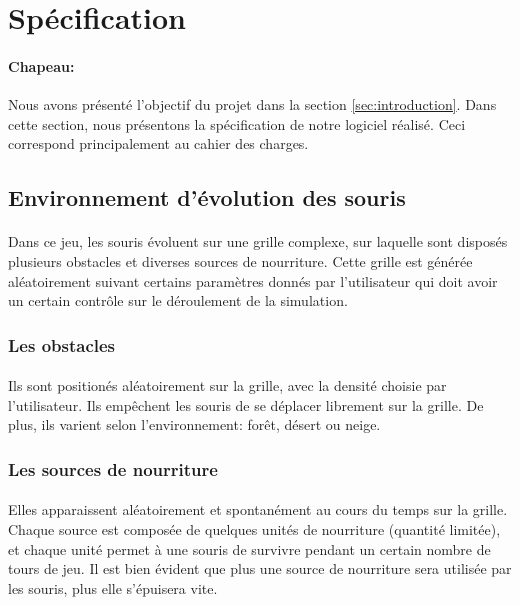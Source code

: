 \section{Spécification}
\label{sec:specification}

\paragraph{Chapeau:}Nous avons présenté l'objectif du projet dans la section \ref{sec:introduction}. Dans cette section, nous présentons la spécification de notre logiciel réalisé. Ceci correspond principalement au cahier des charges.

\subsection{Environnement d'évolution des souris}
\label{sec:environnement}

\paragraph{}Dans ce jeu, les souris évoluent sur une grille complexe, sur laquelle sont disposés plusieurs obstacles et diverses sources de nourriture. Cette grille est générée aléatoirement suivant certains paramètres donnés par l'utilisateur qui doit avoir un certain contrôle sur le déroulement de la simulation.

\subsubsection{Les obstacles}
\paragraph{} Ils sont positionés aléatoirement sur la grille, avec la densité choisie par l’utilisateur. Ils empêchent les souris de se déplacer librement sur la grille. De plus, ils varient selon l'environnement: forêt, désert ou neige.

\subsubsection{Les sources de nourriture}
\paragraph{} Elles apparaissent aléatoirement et spontanément au cours du temps sur la grille. Chaque source est composée de quelques unités de nourriture (quantité limitée), et chaque unité permet à une souris de survivre pendant un certain nombre de tours de jeu. Il est bien évident que plus une source de nourriture sera utilisée par les souris, plus elle s'épuisera vite.

